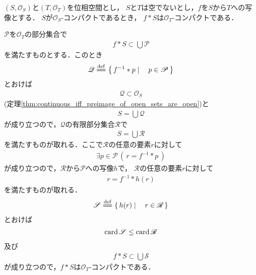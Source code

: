 	\begin{screen}
		\begin{thm}[コンパクト集合の連続写像による像はコンパクト]
			$(S,\mathscr{O}_{S})$と$(T,\mathscr{O}_{T})$を位相空間とし，
			$S$と$T$は空でないとし，$f$を$S$から$T$への写像とする．
			$S$が$\mathscr{O}_{S}$-コンパクトであるとき，
			$f \ast S$は$\mathscr{O}_{T}$-コンパクトである．
		\end{thm}
	\end{screen}
	
	\begin{sketch}
		$\mathscr{P}$を$\mathscr{O}_{T}$の部分集合で
		\begin{align}
			f \ast S \subset \bigcup \mathscr{P}
		\end{align}
		を満たすものとする．このとき
		\begin{align}
			\mathscr{Q} \defeq \Set{f^{-1} \ast p}{p \in \mathscr{P}}
		\end{align}
		とおけば
		\begin{align}
			\mathscr{Q} \subset \mathscr{O}_{S}
		\end{align}
		(定理\ref{thm:continuous_iff_preimage_of_open_sets_are_open})と
		\begin{align}
			S = \bigcup \mathscr{Q}
		\end{align}
		が成り立つので，$\mathscr{Q}$の有限部分集合$\mathscr{R}$で
		\begin{align}
			S = \bigcup \mathscr{R}
		\end{align}
		を満たすものが取れる．ここで$\mathscr{R}$の任意の要素$r$に対して
		\begin{align}
			\exists p \in \mathscr{P}\, \left(\, r = f^{-1} \ast p\, \right)
		\end{align}
		が成り立つので，$\mathscr{R}$から$\mathscr{P}$への写像$h$で，
		$\mathscr{R}$の任意の要素$r$に対して
		\begin{align}
			r = f^{-1} \ast h(r)
		\end{align}
		を満たすものが取れる．
		\begin{align}
			\mathscr{S} \defeq \Set{h(r)}{r \in \mathscr{R}}
		\end{align}
		とおけば
		\begin{align}
			\operatorname{card} \mathscr{S} \leq \operatorname{card} \mathscr{R}
		\end{align}
		及び
		\begin{align}
			f \ast S \subset \bigcup \mathscr{S}
		\end{align}
		が成り立つので，$f \ast S$は$\mathscr{O}_{T}$-コンパクトである．
		\QED
	\end{sketch}
	
